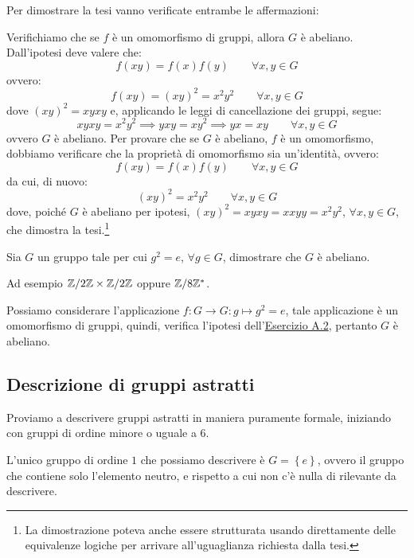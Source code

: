 \documentclass[11pt]{scrartcl}
\begin{document}
\begin{soln}
Per dimostrare la tesi vanno verificate entrambe le affermazioni:
	\begin{itemize}
	\ii Verifichiamo che se $f$ è un omomorfismo di gruppi, allora $G$ è abeliano. Dall'ipotesi deve valere che:
		\[ f(xy)=f(x)f(y)
		\qquad
		\forall x,y \in G
		\]
ovvero:
		\[f(xy)=(xy)^2=x^2y^2 
		\qquad
		\forall x,y \in G
		\]
dove $(xy)^2=xyxy$ e, applicando le leggi di cancellazione dei gruppi, segue:
		\[ xyxy=x^2y^2 \implies yxy = xy^2 \implies yx = xy
		\qquad
		\forall x,y \in G
		\]
ovvero $G$ è abeliano.
	\ii Per provare che se $G$ è abeliano, $f$ è un omomorfismo, dobbiamo verificare che la proprietà di omomorfismo sia un'identità, ovvero:
		\[ f(xy)=f(x)f(y)
		\qquad
		\forall x,y \in G
		\]
da cui, di nuovo:
		\[ (xy)^2=x^2y^2
		\qquad
		\forall x,y \in G
		\]
dove, poiché $G$ è abeliano per ipotesi, $(xy)^2=xyxy=xxyy=x^2y^2$, $\forall x,y \in G$, che dimostra la tesi.\footnote{La dimostrazione poteva anche essere strutturata usando direttamente delle equivalenze logiche per arrivare all'uguaglianza richiesta dalla tesi.} 
	\end{itemize}
\end{soln}

\begin{exercise}
\label{A.3}
Sia $G$ un gruppo tale per cui $g^2 = e$, $\forall g \in G$, dimostrare che $G$ è abeliano.
\end{exercise}

Ad esempio $\mathbb Z/2\mathbb Z \times \mathbb Z/2\mathbb Z$ oppure $\mathbb Z/8\mathbb Z^*$.

\begin{soln}
Possiamo considerare l'applicazione $f: G \longrightarrow G: g \longmapsto g^2=e$, tale applicazione è un omomorfismo di gruppi, quindi, verifica l'ipotesi dell'\hyperref[A:2]{Esercizio A.2}, pertanto $G$ è abeliano.
\end{soln}

\subsection{Descrizione di gruppi astratti}
Proviamo a descrivere gruppi astratti in maniera puramente formale, iniziando con gruppi di ordine minore o uguale a $6$.

\begin{remark}
L'unico gruppo di ordine $1$ che possiamo descrivere è $G = \left\{e\right\}$, ovvero il gruppo che contiene solo l'elemento neutro, e rispetto a cui non c'è nulla di rilevante da descrivere.
\end{remark}
\end{document}
